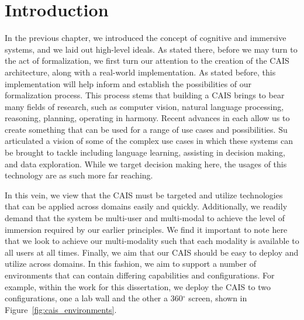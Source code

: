 \section{Introduction}

In the previous chapter, we introduced the concept of cognitive and immersive
systems, and we laid out high-level ideals. As stated there, before we may turn
to the act of formalization, we first turn our attention to the creation of
the CAIS architecture, along with a real-world implementation. As stated before,
this implementation will help inform and establish the possibilities of our
formalization process. This process stems that building a CAIS brings to bear
many fields of research, such as computer vision, natural language processing,
reasoning, planning, operating in harmony. Recent advances in each allow us
to create something that can be used for a range of use cases and possibilities.
Su~\cite{su_cognitive_2017} articulated a vision of some of the complex use
cases in which these systems can be brought to tackle including language
learning, assisting in decision making, and data exploration. While we target
decision making here, the usages of this technology are as such more far reaching.

In this vein, we view that the CAIS must be targeted and utilize technologies
that can be applied across domains easily and quickly. Additionally, we readily
demand that the system be multi-user and multi-modal to achieve the level of
immersion required by our earlier principles. We find it important to note here
that we look to achieve our multi-modality such that each modality is available
to all users at all times. Finally, we aim that our CAIS should be easy to deploy
and utilize across domains. In this fashion, we aim to support a number of
environments that can contain differing capabilities and configurations. For
example, within the work for this dissertation, we deploy the CAIS to two
configurations, one a lab wall and the other a 360$^{\circ}$ screen, shown in
Figure~\ref{fig:cais_environments}. 

